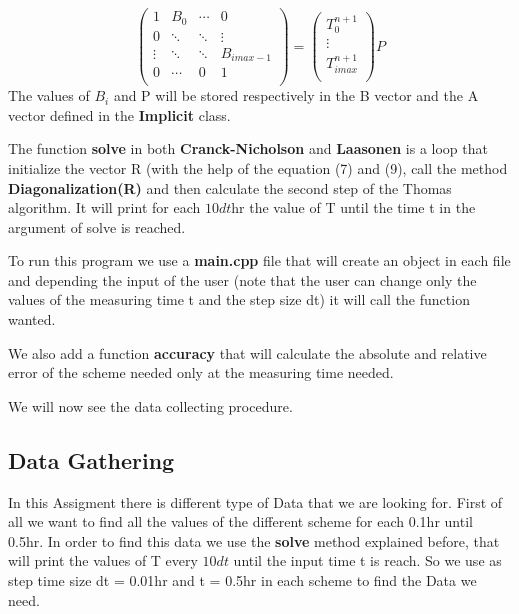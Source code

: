 \documentclass [10 pt, a4 paper]{article}
\begin{document}
\begin{equation}
\begin{pmatrix} 1    &    B_{0}    & \cdots &   0    \\
                0    & \ddots     & \ddots  & \vdots \\
                \vdots & \ddots & \ddots & B_{imax - 1}  \\ 
                0    & \cdots   &   0    &    1   \\
\end{pmatrix}
=
\begin{pmatrix} T_{0}^{n+1} \\ 
\vdots \\ 
T_{imax}^{n+1} \\
\end{pmatrix}
P
\end{equation}
The values of $B_{i}$ and P will be stored respectively in the B vector and the A
vector defined in the \textbf{Implicit} class.

The function \textbf{solve} in both \textbf{Cranck-Nicholson} and \textbf{Laasonen} 
is a loop that initialize the vector R (with the help of the equation (7) and (9),
call the method \textbf{Diagonalization(R)} and then calculate the second step of the
Thomas algorithm. It will print for each $10dt$hr the value of T until the time t in the
argument of solve is reached.
\vspace{0.5cm}

To run this program we use a \textbf{main.cpp} file that will create an object in each file
and depending the input of the user (note that the user can change only the values of the measuring time t
and the step size dt) it will call the function wanted.

We also add a function \textbf{accuracy} that will calculate the absolute and relative error of the scheme needed
only at the measuring time needed.

We will now see the data collecting procedure.


\subsection{Data Gathering}

In this Assigment there is different type of Data that we are looking for.
First of all we want to find all the values of the different scheme for each 0.1hr until 0.5hr.
In order to find this data we use the \textbf{solve} method explained before, that will print 
the values of T every $10dt$ until the input time t is reach. So we use as step time size 
dt = 0.01hr and t = 0.5hr in each scheme to find the Data we need.
\end{document}
